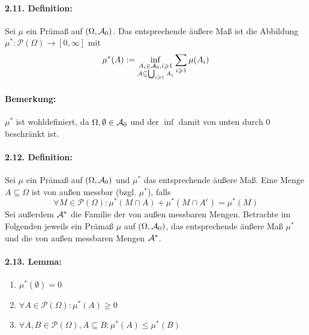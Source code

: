 \documentclass[12pt]{report}
\begin{document}
\paragraph{2.11. Definition:}Sei $\mu$ ein Pr\"ama\ss{} auf $(\Omega,\mathcal{A}_0)$. Das entsprechende \"au\ss{}ere Ma\ss{} ist die Abbildung $\mu^*:\mathcal{P}(\Omega)\to[0,\infty]$ mit 
$$\mu^*(A):=\inf_{\substack{A_i\in\mathcal{A}_0,i\geqslant1\\ A\subseteq\bigcup_{i\geqslant1}A_i}}\sum_{i\geqslant1}\mu(A_i)$$

\paragraph{Bemerkung:}$\mu^*$ ist wohldefiniert, da $\Omega,\emptyset\in\mathcal{A}_0$ und der $\inf$ damit von unten durch $0$ beschr\"ankt ist. 

\paragraph{2.12. Definition:}Sei $\mu$ ein Pr\"ama\ss{} auf $(\Omega,\mathcal{A}_0)$ und $\mu^*$ das entsprechende \"au\ss{}ere Ma\ss{}. Eine Menge $A\subseteq\Omega$ ist von au\ss{}en messbar (bzgl. $\mu^*$), falls
$$\forall M\in\mathcal{P}(\Omega):\mu^*(M\cap A)+\mu^*(M\cap A^c)=\mu^*(M)$$
Sei au\ss{}erdem $\mathcal{A}^*$ die Familie der von au\ss{}en messbaren Mengen.\newline \newline
Betrachte im Folgenden jeweils ein Pr\"ama\ss{} $\mu$ auf $(\Omega,\mathcal{A}_0)$, das entsprechende \"au\ss{}ere Ma\ss{} $\mu^*$ und die von au\ss{}en messbaren Mengen $\mathcal{A}^*$.

\paragraph{2.13. Lemma:}
\begin{enumerate}[label=(\roman*)]
    \item $\mu^*(\emptyset)=0$
    \item $\forall A\in\mathcal{P}(\Omega):\mu^*(A)\geq0$
    \item $\forall A,B\in\mathcal{P}(\Omega),A\subseteq B:\mu^*(A)\leq\mu^*(B)$
\end{enumerate}
\end{document}
